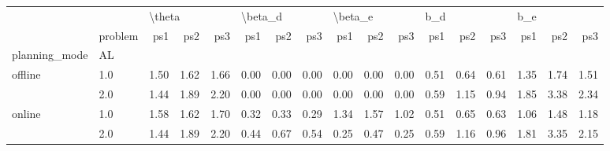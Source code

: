 \begin{tabular}{llrrrrrrrrrrrrrrr}
\toprule
       & {} & \multicolumn{3}{l}{\textbackslash theta} & \multicolumn{3}{l}{\textbackslash beta\_d} & \multicolumn{3}{l}{\textbackslash beta\_e} & \multicolumn{3}{l}{b\_d} & \multicolumn{3}{l}{b\_e} \\
       & problem &    ps1 &  ps2 &  ps3 &     ps1 &  ps2 &  ps3 &     ps1 &  ps2 &  ps3 &  ps1 &  ps2 &  ps3 &  ps1 &  ps2 &  ps3 \\
planning\_mode & AL &        &      &      &         &      &      &         &      &      &      &      &      &      &      &      \\
\midrule
offline & 1.0 &   1.50 & 1.62 & 1.66 &    0.00 & 0.00 & 0.00 &    0.00 & 0.00 & 0.00 & 0.51 & 0.64 & 0.61 & 1.35 & 1.74 & 1.51 \\
       & 2.0 &   1.44 & 1.89 & 2.20 &    0.00 & 0.00 & 0.00 &    0.00 & 0.00 & 0.00 & 0.59 & 1.15 & 0.94 & 1.85 & 3.38 & 2.34 \\
online & 1.0 &   1.58 & 1.62 & 1.70 &    0.32 & 0.33 & 0.29 &    1.34 & 1.57 & 1.02 & 0.51 & 0.65 & 0.63 & 1.06 & 1.48 & 1.18 \\
       & 2.0 &   1.44 & 1.89 & 2.20 &    0.44 & 0.67 & 0.54 &    0.25 & 0.47 & 0.25 & 0.59 & 1.16 & 0.96 & 1.81 & 3.35 & 2.15 \\
\bottomrule
\end{tabular}
